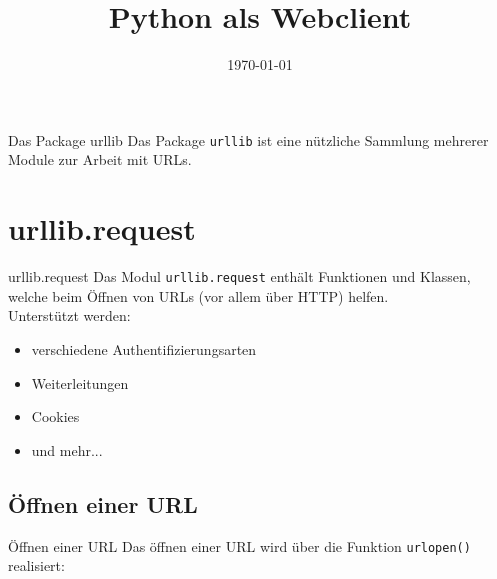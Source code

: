 


\newcommand{\topic}{
	Python als Webclient
}

\title{\topic}
\supertitle{\course}
\date{\today}


\maketitle

\begin{frame}
	\tableofcontents
\end{frame}


\begin{frame}[fragile]{Das Package urllib}
	Das Package \texttt{urllib} ist eine n\"utzliche Sammlung mehrerer Module
	zur Arbeit mit URLs.
\end{frame}


\section{urllib.request}
\begin{frame}[fragile]{urllib.request}
	Das Modul \texttt{urllib.request} enth\"alt Funktionen und Klassen, welche
	beim \"Offnen von URLs (vor allem \"uber HTTP) helfen. \\[.5cm]
	Unterst\"utzt werden:
	\begin{itemize}
		\item verschiedene Authentifizierungsarten
		\item Weiterleitungen
		\item Cookies
		\item und mehr...
	\end{itemize}
\end{frame}

\subsection{\"Offnen einer URL}
\begin{frame}[fragile]{\"Offnen einer URL}
	Das \"offnen einer URL wird \"uber die Funktion \texttt{urlopen()} realisiert:
	
\end{frame}

